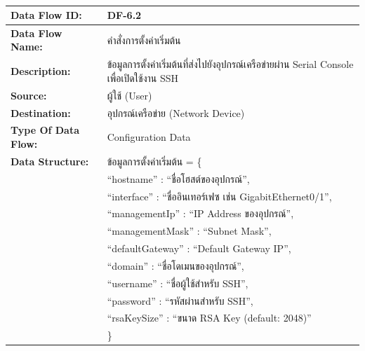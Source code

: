 \begin{table}[H]
    \caption{}
    \label{tab:df-6-2}
    \fontSixTeen 
    \begin{tabularx}{\textwidth}{|l|L|} 
        \hline
        \textbf{Data Flow ID:} & DF-6.2 \\
        \hline
        \textbf{Data Flow Name:} & คำสั่งการตั้งค่าเริ่มต้น \\
        \hline
        \textbf{Description:} & ข้อมูลการตั้งค่าเริ่มต้นที่ส่งไปยังอุปกรณ์เครือข่ายผ่าน Serial Console เพื่อเปิดใช้งาน SSH \\
        \hline
        \textbf{Source:} & ผู้ใช้ (User) \\
        \hline
        \textbf{Destination:} & อุปกรณ์เครือข่าย (Network Device) \\
        \hline
        \textbf{Type Of Data Flow:} & Configuration Data \\
        \hline
        \textbf{Data Structure:} & ข้อมูลการตั้งค่าเริ่มต้น = \{ \nonumber \\
                        & \hspace{1em} ``hostname'' : ``ชื่อโฮสต์ของอุปกรณ์'', \nonumber \\
                        & \hspace{1em} ``interface'' : ``ชื่ออินเทอร์เฟซ เช่น GigabitEthernet0/1'', \nonumber \\
                        & \hspace{1em} ``managementIp'' : ``IP Address ของอุปกรณ์'', \nonumber \\
                        & \hspace{1em} ``managementMask'' : ``Subnet Mask'', \nonumber \\
                        & \hspace{1em} ``defaultGateway'' : ``Default Gateway IP'', \nonumber \\
                        & \hspace{1em} ``domain'' : ``ชื่อโดเมนของอุปกรณ์'', \nonumber \\
                        & \hspace{1em} ``username'' : ``ชื่อผู้ใช้สำหรับ SSH'', \nonumber \\
                        & \hspace{1em} ``password'' : ``รหัสผ่านสำหรับ SSH'', \nonumber \\
                        & \hspace{1em} ``rsaKeySize'' : ``ขนาด RSA Key (default: 2048)'' \nonumber \\
                        & \} \\
        \hline
    \end{tabularx}
\end{table}

